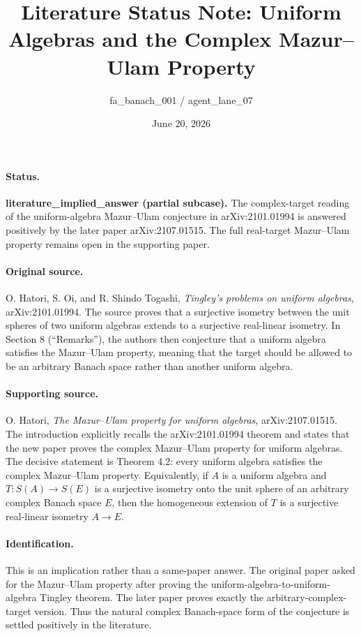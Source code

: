 \documentclass[11pt]{article}
\title{Literature Status Note: Uniform Algebras and the Complex Mazur--Ulam Property}
\author{fa\_banach\_001 / agent\_lane\_07}
\date{June 20, 2026}
\begin{document}
\maketitle

\paragraph{Status.}
\textbf{literature\_implied\_answer (partial subcase).}
The complex-target reading of the uniform-algebra Mazur--Ulam conjecture in
arXiv:2101.01994 is answered positively by the later paper arXiv:2107.01515.
The full real-target Mazur--Ulam property remains open in the supporting paper.

\paragraph{Original source.}
O. Hatori, S. Oi, and R. Shindo Togashi,
\emph{Tingley's problems on uniform algebras}, arXiv:2101.01994.
The source proves that a surjective isometry between the unit spheres of two
uniform algebras extends to a surjective real-linear isometry.  In Section 8
(``Remarks''), the authors then conjecture that a uniform algebra satisfies the
Mazur--Ulam property, meaning that the target should be allowed to be an
arbitrary Banach space rather than another uniform algebra.

\paragraph{Supporting source.}
O. Hatori, \emph{The Mazur--Ulam property for uniform algebras},
arXiv:2107.01515.
The introduction explicitly recalls the arXiv:2101.01994 theorem and states
that the new paper proves the complex Mazur--Ulam property for uniform
algebras.  The decisive statement is Theorem 4.2: every uniform algebra
satisfies the complex Mazur--Ulam property.  Equivalently, if \(A\) is a
uniform algebra and \(T:S(A)\to S(E)\) is a surjective isometry onto the unit
sphere of an arbitrary complex Banach space \(E\), then the homogeneous
extension of \(T\) is a surjective real-linear isometry \(A\to E\).

\paragraph{Identification.}
This is an implication rather than a same-paper answer.  The original paper
asked for the Mazur--Ulam property after proving the uniform-algebra-to-uniform-
algebra Tingley theorem.  The later paper proves exactly the arbitrary-complex-
target version.  Thus the natural complex Banach-space form of the conjecture
is settled positively in the literature.
\end{document}
